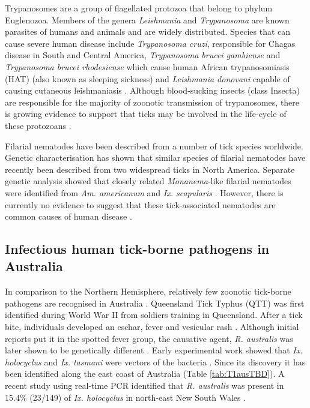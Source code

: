 \documentclass[a4paper, nobind]{templates/ociamthesis}
\begin{document}
Trypanosomes are a group of flagellated protozoa that belong to phylum Euglenozoa.
Members of the genera \emph{Leishmania} and \emph{Trypanosoma} are known parasites of humans and animals and are widely distributed.
Species that can cause severe human disease include \emph{Trypanosoma cruzi}, responsible for Chagas disease in South and Central America, \emph{Trypanosoma brucei gambiense} and \emph{Trypanosoma brucei rhodesiense} which cause human African trypanosomiasis (HAT) (also known as sleeping sickness) and \emph{Leishmania donovani} capable of causing cutaneous leishmaniasis \autocite{kauferReviewSystematicsSpecies2020}.
Although blood-sucking insects (class Insecta) are responsible for the majority of zoonotic transmission of trypanosomes, there is growing evidence to support that ticks may be involved in the life-cycle of these protozoans \autocite{morzariaTransmissionTrypanosomaSp1986,thekisoeTrypanosomeSpeciesIsolated2007}.

Filarial nematodes have been described from a number of tick species worldwide.
Genetic characterisation has shown that similar species of filarial nematodes have recently been described from two widespread ticks in North America.
Separate genetic analysis showed that closely related \emph{Monanema}-like filarial nematodes were identified from \emph{Am. americanum} \autocite{henningDiscoveryFilarialNematode2016} and \emph{Ix. scapularis} \autocite{tokarzCharacterizationMonanemaNematode2020}.
However, there is currently no evidence to suggest that these tick-associated nematodes are common causes of human disease \autocite{tokarzCharacterizationMonanemaNematode2020}.

\hypertarget{infectious-human-tick-borne-pathogens-in-australia}{%
\subsection{Infectious human tick-borne pathogens in Australia}\label{infectious-human-tick-borne-pathogens-in-australia}}

In comparison to the Northern Hemisphere, relatively few zoonotic tick-borne pathogens are recognised in Australia \autocite{madison-antenucciEmergingTickBorneDiseases2020,rochlinEmergingTickbornePathogens2020}.
Queensland Tick Typhus (QTT) was first identified during World War II from soldiers training in Queensland.
After a tick bite, individuals developed an eschar, fever and vesicular rash \autocite{andrewTickTyphusNorth1946}.
Although initial reports put it in the spotted fever group, the causative agent, \emph{R. australis} was later shown to be genetically different \autocite{stenosRickettsialOutermembraneProtein2000}.
Early experimental work showed that \emph{Ix. holocyclus} and \emph{Ix. tasmani} were vectors of the bacteria \autocite{campbellRickettsiosesAustraliaIsolation1974}.
Since its discovery it has been identified along the east coast of Australia \autocite{campbellQueenslandTickTyphus1979,wilsonQueenslandTickTyphus2013,fergieQueenslandTickTyphus2017} (Table \ref{tab:T1ausTBD}).
A recent study using real-time PCR identified that \emph{R. australis} was present in 15.4\% (23/149) of \emph{Ix. holocyclus} in north-east New South Wales \autocite{gravesIxodesHolocyclusTicktransmitted2016}.
\end{document}
